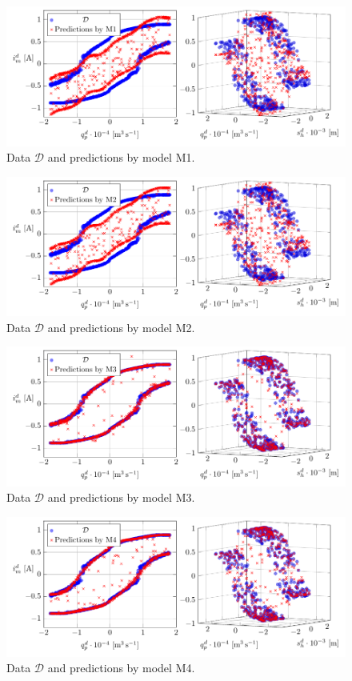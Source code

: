 \begin{figure}[H]
	\centering 
	\includegraphics{graphics/pgfplots/cha5/Bosch/M1.pdf}
	\caption{Data $\mathcal{D}$ and predictions by model M1.}
	\label{fig:bosch-M1}
\end{figure}

\begin{figure}[H]
	\centering 
	\includegraphics{graphics/pgfplots/cha5/Bosch/M2.pdf}
	\caption{Data $\mathcal{D}$ and predictions by model M2.}
	\label{fig:bosch-M2}
\end{figure}

\begin{figure}[H]
	\centering 
	\includegraphics{graphics/pgfplots/cha5/Bosch/M3.pdf}
	\caption{Data $\mathcal{D}$ and predictions by model M3.}
	\label{fig:bosch-M3}
\end{figure}

\begin{figure}[H]
	\centering 
	\includegraphics{graphics/pgfplots/cha5/Bosch/M4.pdf}
	\caption{Data $\mathcal{D}$ and predictions by model M4.}
	\label{fig:bosch-M4}
\end{figure}

